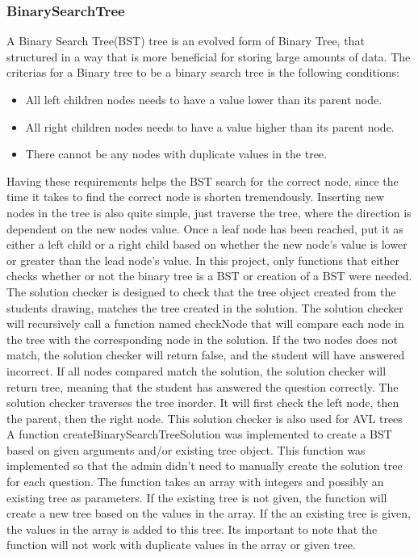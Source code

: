\subsubsection{BinarySearchTree}
A Binary Search Tree(BST) tree is an evolved form of Binary Tree, that structured in a way that is more beneficial for storing large amounts of data. The criterias for a Binary tree to be a binary search tree is the following conditions:
\begin{itemize}
	\item{All left children nodes needs to have a value lower than its parent node.}
	\item{All right children nodes needs to have a value higher than its parent node.}
	\item{There cannot be any nodes with duplicate values in the tree.}
\end{itemize}
Having these requirements helps the BST search for the correct node, since the time it takes to find the correct node is shorten tremendously. Inserting new nodes in the tree is also quite simple, just traverse the tree, where the direction is dependent on the new nodes value. Once a leaf node has been reached, put it as either a left child or a right child based on whether the new node's value is lower or greater than the lead node's value. In this project, only functions that either checks whether or not the binary tree is a BST or creation of a BST were needed. %
\\[11pt]
The solution checker is designed to check that the tree object created from the students drawing, matches the tree created in the solution. The solution checker will recursively call a function named checkNode that will compare each node in the tree with the corresponding node in the solution. If the two nodes does not match, the solution checker will return false, and the student will have answered incorrect. If all nodes compared match the solution, the solution checker will return tree, meaning that the student has answered the question correctly. The solution checker traverses the tree inorder. It will first check the left node, then the parent, then the right node. This solution checker is also used for AVL trees%
\\[11pt]
A function createBinarySearchTreeSolution was implemented to create a BST based on given arguments and/or existing tree object. This function was implemented so that the admin didn't need to manually create the solution tree for each question. The function takes an array with integers and possibly an existing tree as parameters. If the existing tree is not given, the function will create a new tree based on the values in the array. If the an existing tree is given, the values in the array is added to this tree. Its important to note that the function will not work with duplicate values in the array or given tree.
